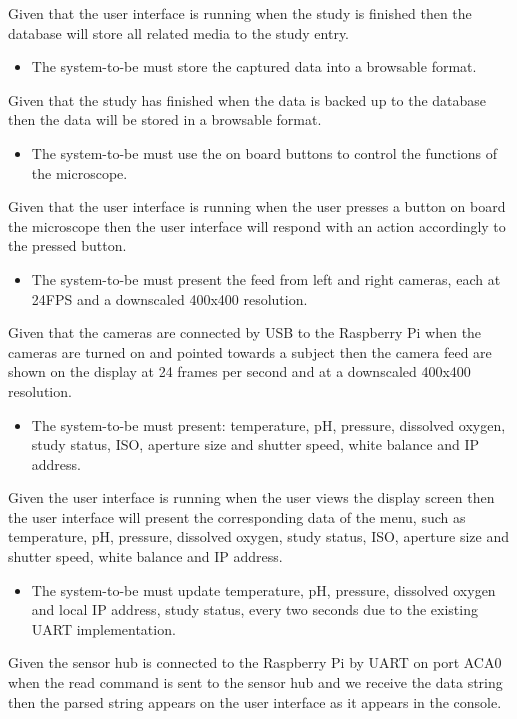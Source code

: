 Given that the user interface is running when the study is finished then the database will store all related media to the study entry.
\begin{itemize}
    \item The system-to-be must store the captured data into a browsable format.
\end{itemize}
Given that the study has finished when the data is backed up to the database then the data will be stored in a browsable format.
\begin{itemize}
    \item The system-to-be must use the on board buttons to control the functions of the microscope.
\end{itemize}
Given that the user interface is running when the user presses a button on board the microscope then the user interface will respond with an action accordingly to the pressed button.
\begin{itemize}
   \item The system-to-be must present the feed from left and right cameras, each at 24FPS and a downscaled 400x400 resolution.
\end{itemize}
Given that the cameras are connected by USB to the Raspberry Pi when the cameras are turned on and pointed towards a subject then the camera feed are shown on the display at 24 frames per second and at a downscaled 400x400 resolution.
\begin{itemize}
    \item The system-to-be must present: temperature, pH, pressure, dissolved oxygen, study status, ISO, aperture size and shutter speed, white balance and IP address.
\end{itemize}
Given the user interface is running when the user views the display screen then the user interface will present the corresponding data of the menu, such as temperature, pH, pressure, dissolved oxygen, study status, ISO, aperture size and shutter speed, white balance and IP address.
\begin{itemize}
    \item The system-to-be must update temperature, pH, pressure, dissolved oxygen and local IP address, study status, every two seconds due to the existing UART implementation.
\end{itemize}
Given the sensor hub is connected to the Raspberry Pi by UART on port ACA0 when the read command is sent to the sensor hub and we receive the data string then the parsed string appears on the user interface as it appears in the console.
